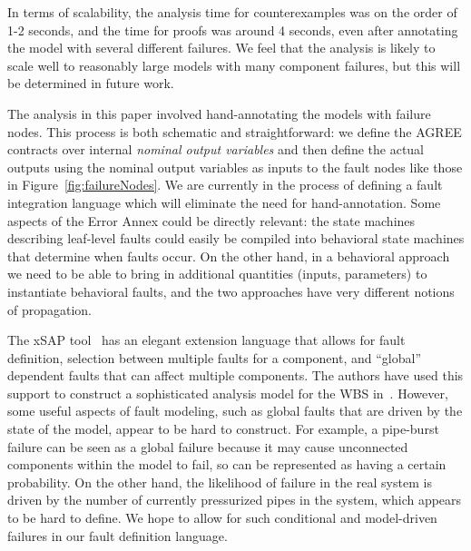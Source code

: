 In terms of scalability, the analysis time for counterexamples was on the order of 1-2 seconds, and the time for proofs was around 4 seconds, even after annotating the model with several different failures.  We feel that the analysis is likely to scale well to reasonably large models with many component failures, but this will be determined in future work.

The analysis in this paper involved hand-annotating the models with failure nodes.  This process is both schematic and straightforward: we define the AGREE contracts over internal {\em nominal output variables} and then define the actual outputs using the nominal output variables as inputs to the fault nodes like those in Figure~\ref{fig:failureNodes}.   We are currently in the process of defining a fault integration language which will eliminate the need for hand-annotation.  Some aspects of the Error Annex could be directly relevant: the state machines describing leaf-level faults could easily be compiled into behavioral state machines that determine when faults occur.  On the other hand, in a behavioral approach we need to be able to bring in additional quantities (inputs, parameters) to instantiate behavioral faults, and the two approaches have very different notions of propagation.

The xSAP tool~\cite{DBLP:conf/tacas/BittnerBCCGGMMZ16} has an elegant extension language that allows for fault definition, selection between multiple faults for a component, and ``global'' dependent faults that can affect multiple components.  The authors have used this support to construct a sophisticated analysis model for the WBS in~\cite{DBLP:conf/cav/BozzanoCPJKPRT15}.  However, some useful aspects of fault modeling, such as global faults that are driven by the state of the model, appear to be hard to construct.  For example, a pipe-burst failure can be seen as a global failure because it may cause unconnected components within the model to fail, so can be represented as having a certain probability.  On the other hand, the likelihood of failure in the real system is driven by the number of currently pressurized pipes in the system, which appears to be hard to define.  We hope to allow for such conditional and model-driven failures in our fault definition language.



